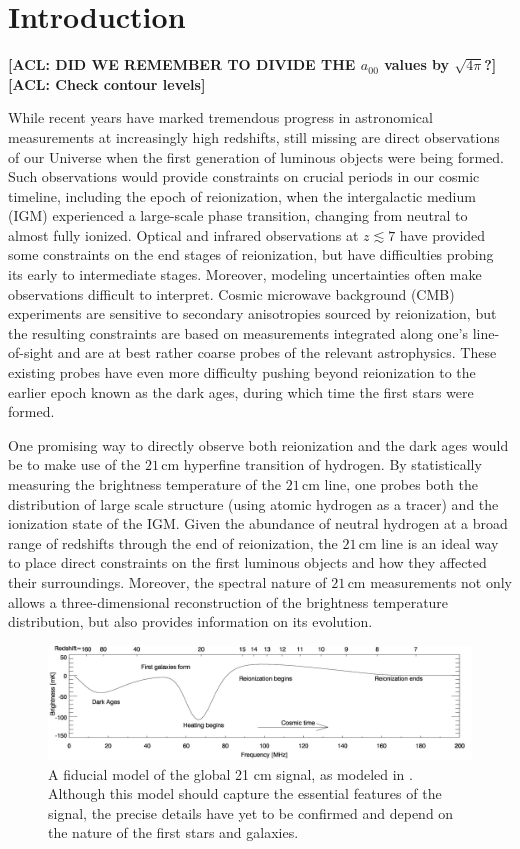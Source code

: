 \documentclass[twolcolumn,apj,iop,numberedappendix]{emulateapj}
\newcommand{\acl}[1]{{\color{red} \textbf{[ACL:  #1]}}}
\begin{document}
\section{Introduction}
\acl{DID WE REMEMBER TO DIVIDE THE $a_{00}$ values by $\sqrt{4\pi}$?}
\acl{Check contour levels}

While recent years have marked tremendous progress in astronomical measurements at increasingly high redshifts, still missing are direct observations of our Universe when the first generation of luminous objects were being formed. Such observations would provide constraints on crucial periods in our cosmic timeline, including the epoch of reionization, when the intergalactic medium (IGM) experienced a large-scale phase transition, changing from neutral to almost fully ionized. Optical and infrared observations at $z \lesssim 7$ have provided some constraints on the end stages of reionization, but have difficulties probing its early to intermediate stages. Moreover, modeling uncertainties often make observations difficult to interpret. Cosmic microwave background (CMB) experiments are sensitive to secondary anisotropies sourced by reionization, but the resulting constraints are based on measurements integrated along one's line-of-sight and are at best rather coarse probes of the relevant astrophysics. These existing probes have even more difficulty pushing beyond reionization to the earlier epoch known as the dark ages, during which time the first stars were formed.

One promising way to directly observe both reionization and the dark ages would be to make use of the $21\,\textrm{cm}$ hyperfine transition of hydrogen. By statistically measuring the brightness temperature of the $21\,\textrm{cm}$ line, one probes both the distribution of large scale structure (using atomic hydrogen as a tracer) and the ionization state of the IGM. Given the abundance of neutral hydrogen at a broad range of redshifts through the end of reionization, the $21\,\textrm{cm}$ line is an ideal way to place direct constraints on the first luminous objects and how they affected their surroundings. Moreover, the spectral nature of $21\,\textrm{cm}$ measurements not only allows a three-dimensional reconstruction of the brightness temperature distribution, but also provides information on its evolution.


\begin{figure}[!]
	\centering
	\includegraphics[width=1.00\textwidth]{figures/fidModel.png}
	\caption{A fiducial model of the global 21 cm signal, as modeled in \citet{PritchardLoeb2010}. Although this model should capture the essential features of the signal, the precise details have yet to be confirmed and depend on the nature of the first stars and galaxies.}
	\label{fig:21cmSignal}
\end{figure}
\end{document}
